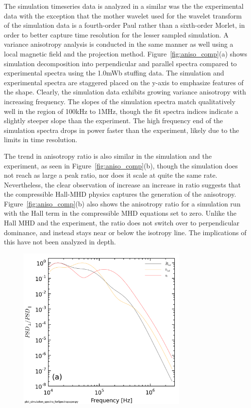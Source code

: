 \documentclass[aip,prl,amsmath,amssymb,reprint,superscriptaddress]{revtex4-1} %
\begin{document}
The simulation timeseries data is analyzed in a similar was the the experimental data with the exception that the mother wavelet used for the wavelet transform of the simulation data is a fourth-order Paul rather than a sixth-order Morlet, in order to better capture time resolution for the lesser sampled simulation. A variance anisotropy analysis is conducted in the same manner as well using a local magnetic field and the projection method. Figure~\ref{fig:aniso_comp}(a) shows simulation decomposition into perpendicular and parallel spectra compared to experimental spectra using the 1.0mWb stuffing data. The simulation and experimental spectra are staggered placed on the y-axis to emphasize features of the shape. Clearly, the simulation data exhibits growing variance anisotropy with increasing frequency. The slopes of the simulation spectra match qualitatively well in the region of 100kHz to 1MHz, though the fit spectra indices indicate a slightly steeper slope than the experiment. The high frequency end of the simulation spectra drops in power faster than the experiment, likely due to the limits in time resolution.

The trend in anisotropy ratio is also similar in the simulation and the experiment, as seen in Figure~\ref{fig:aniso_comp}(b), though the simulation does not reach as large a peak ratio, nor does it scale at quite the same rate. Nevertheless, the clear observation of increase an increase in ratio suggests that the compressible Hall-MHD physics captures the generation of the anisotropy. Figure~\ref{fig:aniso_comp}(b) also shows the anisotropy ratio for a simulation run with the Hall term in the compressible MHD equations set to zero. Unlike the Hall MHD and the experiment, the ratio does not switch over to perpendicular dominance, and instead stays near or below the isotropy line. The implications of this have not been analyzed in depth.

\begin{figure}[!htbp]
\centerline{
\includegraphics[width=8.5cm]{BfieldFlow_simulation_comparison}}
\caption{\label{fig:bflow_comp}}
\end{figure}
\end{document}
